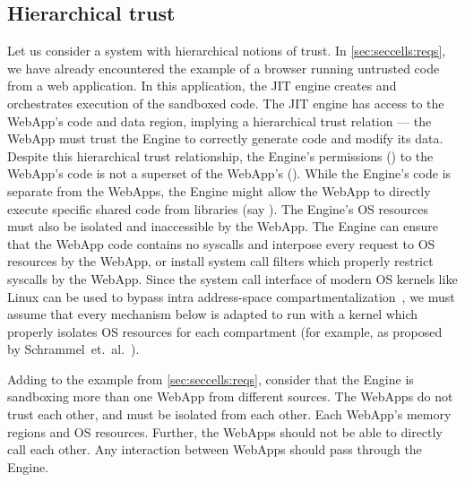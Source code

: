 \subsection{Hierarchical trust} 
\label{sec:compreview:usecases:hierarchical}
Let us consider a system with hierarchical notions of trust.
In \autoref{sec:seccells:reqs}, we have already encountered the example of
a browser running untrusted code from a web application.
In this application, the JIT engine creates and orchestrates execution of
the sandboxed code.
The JIT engine has access to the WebApp's code and data region, implying
a hierarchical trust relation ---
the WebApp must trust the Engine to correctly generate code and modify
its data.
Despite this hierarchical trust relationship, 
the Engine's permissions () to the WebApp's code is not a
superset of the WebApp's ().
While the Engine's code is separate from the WebApps, the Engine might allow
the WebApp to directly execute specific shared code from 
libraries (say ).
The Engine's OS resources must also be isolated and inaccessible by the
WebApp.
The Engine can ensure that the WebApp code contains no syscalls and interpose
every request to OS resources by the WebApp, or install system call filters
which properly restrict syscalls by the WebApp.
Since the system call interface of modern OS kernels like Linux can be used to 
bypass intra address-space compartmentalization~\cite{ConnorMSS20}, we must
assume that every mechanism below is adapted to run with a kernel which
properly isolates OS resources for each compartment (for example, as proposed 
by Schrammel~et.~al.~\cite{schrammel2022jenny}).

Adding to the example from \autoref{sec:seccells:reqs}, consider that the
Engine is sandboxing more than one WebApp from different sources.
The WebApps do not trust each other, and must be isolated from each other.
Each WebApp's memory regions and OS resources.
Further, the WebApps should not be able to directly call each other.
Any interaction between WebApps should pass through the Engine.

